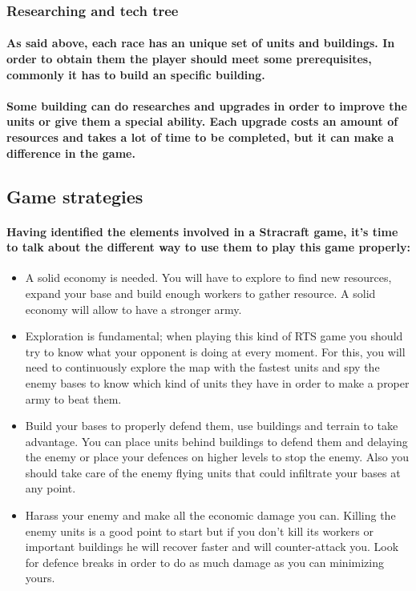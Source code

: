 \documentclass[a4paper,10pt]{article}
\newcommand{\p}[1]{\paragraph{\indent\textnormal{#1}}}
\begin{document}
    \subsubsection{Researching and tech tree}

      \p{As said above, each race has an unique set of units and buildings. In order to obtain them the player should meet some prerequisites, commonly it has to build an specific building.}

      \p{Some building can do researches and upgrades in order to improve the units or give them a special ability. Each upgrade costs an amount of resources and takes a lot of time to be completed, but it can make a difference in the game.}

  \subsection{Game strategies}

    \p{Having identified the elements involved in a Stracraft game, it's time to talk about the different way to use them to play this game properly:}

    \begin{itemize}
     \item A solid economy is needed. You will have to explore to find new resources, expand your base and build enough workers to gather resource. A solid economy will allow to have a stronger army.
     \item Exploration is fundamental; when playing this kind of RTS game you should try to know what your opponent is doing at every moment. For this, you will need to continuously explore the map with the fastest units and spy the enemy bases to know which kind of units they have in order to make a proper army to beat them.
     \item Build your bases to properly defend them, use buildings and terrain to take advantage. You can place units behind buildings to defend them and delaying the enemy or place your defences on higher levels to stop the enemy. Also you should take care of the enemy flying units that could infiltrate your bases at any point.
     \item Harass your enemy and make all the economic damage you can. Killing the enemy units is a good point to start but if you don't kill its workers or important buildings he will recover faster and will counter-attack you. Look for defence breaks in order to do as much damage as you can minimizing yours.
    \end{itemize}
\end{document}
